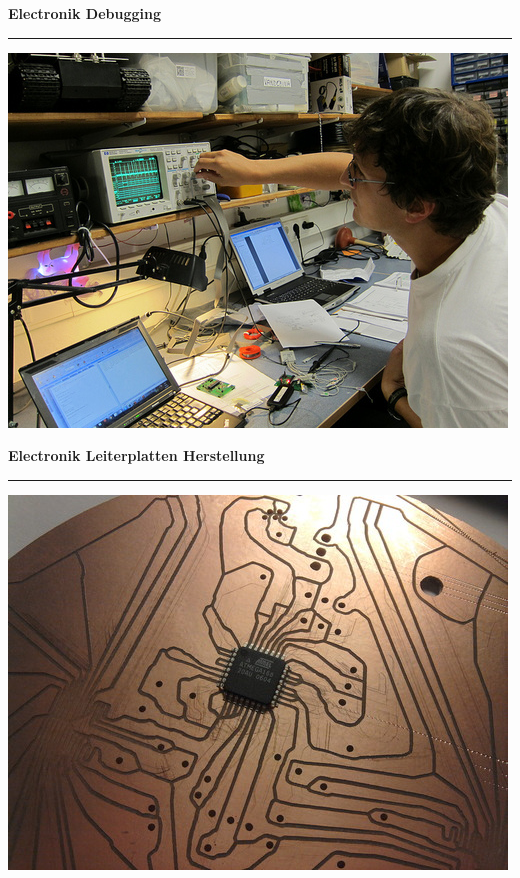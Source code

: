 \documentclass{seminar}
\providecommand{\T}[1]{
	\begin{center}
		{\bf #1}
	\end{center}
	\vspace{2mm}
	\hrule
	\vspace{2mm}
}
\begin{document}
\begin{slide}
	\T{Electronik Debugging}
	\begin{center}
		\includegraphics[scale=0.5]{elektronic_debugging.jpeg}
	\end{center}
\end{slide}

\begin{slide}
	\T{Electronik Leiterplatten Herstellung}
	\begin{center}
		\includegraphics[scale=0.5]{milled_pcb.jpeg}
	\end{center}
\end{slide}
\end{document}
